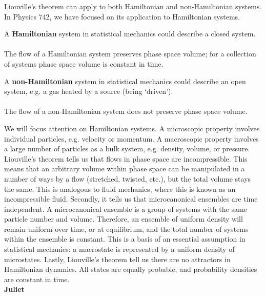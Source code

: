 Liouville's theorem can apply to both Hamiltonian and non-Hamiltonian systems. In Physics 742, we have focused on its application to Hamiltonian systems.
\begin{tcolorbox}[title=Liouville's Theorem \& Hamiltonian Systems]
A \textbf{Hamiltonian} system in statistical mechanics could describe a closed system.
\\ \\
The flow of a Hamiltonian system preserves phase space volume; for a collection of systems phase space volume is constant in time.
\end{tcolorbox}
\begin{tcolorbox}[title=Liouville's Theorem \& Non-Hamiltonian Systems]
A \textbf{non-Hamiltonian} system in statistical mechanics could describe an open system, e.g. a gas heated by a source (being `driven').
\\ \\
The flow of a non-Hamiltonian system does not preserve phase space volume.
\end{tcolorbox}
We will focus attention on Hamiltonian systems. A microscopic property involves individual particles, e.g. velocity or momentum. A macroscopic property involves a large number of particles as a bulk system, e.g. density, volume, or pressure. Liouville's theorem tells us that flows in phase space are incompressible. This means that an arbitrary volume within phase space can be manipulated in a number of ways by a flow (stretched, twisted, etc.), but the total volume stays the same. This is analogous to fluid mechanics, where this is known as an incompressible fluid. Secondly, it tells us that microcanonical ensembles are time independent. A microcanonical ensemble is a group of systems with the same particle number and volume. Therefore, an ensemble of uniform density will remain uniform over time, or at equilibrium, and the total number of systems within the ensemble is constant. This is a basis of an essential assumption in statistical mechanics: a macrostate is represented by a uniform density of microstates. Lastly, Liouville's theorem tell us there are no attractors in Hamiltonian dynamics. All states are equally probable, and probability densities are constant in time.
\\
\textbf{Juliet}